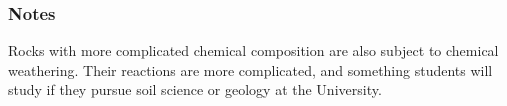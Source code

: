 \subsubsection{Notes}
Rocks with more complicated chemical composition are also subject to chemical weathering. Their reactions are more complicated, and something students will study if they pursue soil science or geology at the University.







